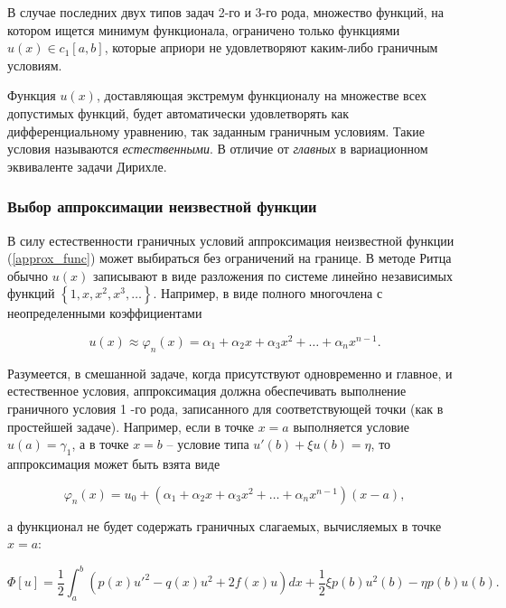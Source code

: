 В случае последних двух типов задач 2-го и 3-го рода, множество функций, на котором ищется минимум функционала, ограничено только функциями $u(x) \in c_{1}\left[a, b\right] $, которые априори не удовлетворяют каким-либо граничным условиям. 

\begin{warn}[Важно!]
	Функция $u(x)$, доставляющая экстремум функционалу на множестве всех допустимых функций, будет автоматически удовлетворять как дифференциальному уравнению, так заданным граничным условиям. Такие условия называются \textit{естественными}. В отличие от \textit{главных} в вариационном эквиваленте задачи Дирихле.
\end{warn}

\subsubsection{Выбор аппроксимации неизвестной функции}

В силу естественности граничных условий аппроксимация неизвестной функции (\ref{approx_func}) может выбираться без ограничений на границе. В методе Ритца обычно $u(x)$ записывают в виде разложения по системе линейно независимых функций $\left\{ 1, x, x^{2}, x^{3}, \dots \right\}$. Например, в виде полного многочлена с неопределенными коэффициентами

\begin{displaymath}
	u(x) \approx \varphi_{n}(x) = \alpha_{1} + \alpha_{2}x + \alpha_{3}x^{2} + \dots + \alpha_{n}x^{n-1}.
\end{displaymath}

Разумеется, в смешанной задаче, когда присутствуют одновременно и главное, и естественное условия, аппроксимация должна обеспечивать выполнение граничного условия 1 -го рода, записанного для соответствующей точки (как в простейшей задаче). Например, если в точке $x = a$ выполняется условие $u(a) = \gamma_{1}$, а в точке $x = b$ -- условие типа $u'(b) + \xi u(b) = \eta$, то аппроксимация может быть взята виде

\begin{displaymath}
	\varphi_{n}(x) = u_{0} + \left( \alpha_{1} + \alpha_{2}x + \alpha_{3}x^{2} + \dots + \alpha_{n}x^{n-1} \right) \left( x - a \right),
\end{displaymath}

\noindent а функционал не будет содержать граничных слагаемых, вычисляемых в точке $x = a$:

\begin{displaymath}
	\Phi[u] = \frac{1}{2} \int_{a}^{b} \left( p(x)u'^{2} - q(x)u^{2} + 2f(x)u \right)dx + \frac{1}{2} \xi p(b) u^{2}(b) - \eta p(b)u(b).
\end{displaymath}

